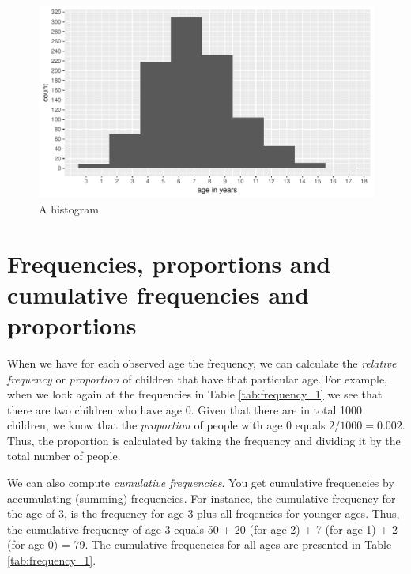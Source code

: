 \documentclass[]{book}\usepackage[]{graphicx}\usepackage[]{color}
\makeatletter
\def\maxwidth{ %
  \ifdim\Gin@nat@width>\linewidth
    \linewidth
  \else
    \Gin@nat@width
  \fi
}
\newenvironment{knitrout}{}{} %
\makeatother
\begin{document}
\begin{knitrout}
\color{fgcolor}\begin{figure}

{\centering \includegraphics[width=\maxwidth]{figure/distr_2-1} 

}

\caption[A histogram]{A histogram}\label{fig:distr_2}
\end{figure}


\end{knitrout}



\section{Frequencies, proportions and cumulative frequencies and proportions}


When we have for each observed age the frequency, we can calculate the \textit{relative frequency} or \textit{proportion} of children that have that particular age. For example, when we look again at the frequencies in Table \ref{tab:frequency_1} we see that there are two children who have age 0. Given that there are in total 1000 children, we know that the \textit{proportion} of people with age 0 equals $2/1000=0.002$. Thus, the proportion is calculated by taking the frequency and dividing it by the total number of people.


We can also compute \textit{cumulative frequencies}. You get cumulative frequencies by accumulating (summing) frequencies. For instance, the cumulative frequency for the age of 3, is the frequency for age 3 plus all freqencies for younger ages. Thus, the cumulative frequency of age 3 equals 50 + 20 (for age 2) + 7 (for age 1) + 2 (for age 0) = 79. The cumulative frequencies for all ages are presented in Table \ref{tab:frequency_1}.
\end{document}
